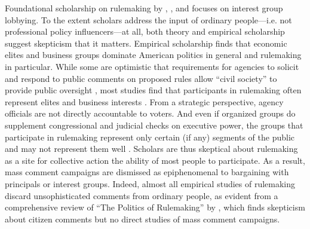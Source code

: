 Foundational scholarship on rulemaking by \citet{Furlong2004}, \citet{Furlong1997, Furlong1998}, and \citet{Kerwin2011} focuses on interest group lobbying. To the extent scholars address the input of ordinary people---i.e. not professional policy influencers---at all, both theory and empirical scholarship suggest skepticism that it matters. 
Empirical scholarship finds that economic elites and business groups dominate American politics in general \citep{Gilens2014} and rulemaking in particular. %
While some are optimistic that requirements for agencies to solicit and respond to public comments on proposed rules allow ``civil society'' to provide public oversight \citep{Michaels2015, Metzger2010}, most studies find that participants in rulemaking often represent elites and business interests \citep{Seifter2016UCLA, Crow2015, Wagner2011, West2009, Yackee2006JOP, Yackee2006JPART, Golden1998, Haeder2015, Cook2017}.%
From a strategic perspective, agency officials are not directly accountable to voters. And even if organized groups do supplement congressional and judicial checks on executive power, the groups that participate in rulemaking represent only certain (if any) segments of the public and may not represent them well \citep{Seifter2016UCLA}. Scholars are thus skeptical about rulemaking as a site for collective action the ability of most people to participate.
As a result, mass comment campaigns are dismissed as epiphenomenal to bargaining with principals or interest groups. Indeed, almost all empirical studies of rulemaking discard unsophisticated comments from ordinary people, as evident from a comprehensive review of ``The Politics of Rulemaking'' by \citet{Yackee2018}, which finds skepticism about citizen comments but no direct studies of mass comment campaigns.
    
